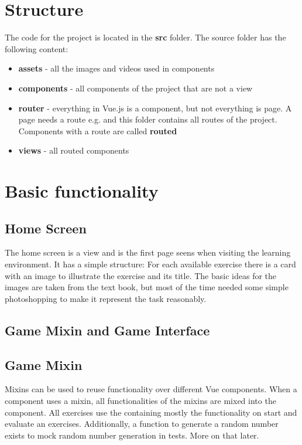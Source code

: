 \section{Structure}
The code for the project is located in the \textbf{src} folder. The source folder has the following content: 

\begin{itemize}
    \item \textbf{assets} - all the images and videos used in components
    \item \textbf{components} - all components of the project that are not a view
    \item \textbf{router} - everything in Vue.js is a component, but not everything is page. A page needs a route e.g.  and this folder contains all routes of the project. Components with a route are called \textbf{routed}
    \item \textbf{views} - all routed components
\end{itemize}

\section{Basic functionality}

\subsection{Home Screen}
The home screen is a view and is the first page seens when visiting the learning environment. It has a simple structure: For each available exercise there is a card with an image to illustrate the exercise and its title. The basic ideas for the images are taken from the text book, but most of the time needed some simple photoshopping to make it represent the task reasonably.

\subsection{Game Mixin and Game Interface}

\subsection*{Game Mixin}
Mixins can be used to reuse functionality over different Vue components. When a component uses a mixin, all functionalities of the mixins are mixed into the component. All exercises use the  containing mostly the functionality on start and evaluate an exercises. Additionally, a function to generate a random number exists to mock random number generation in tests. More on that later.

